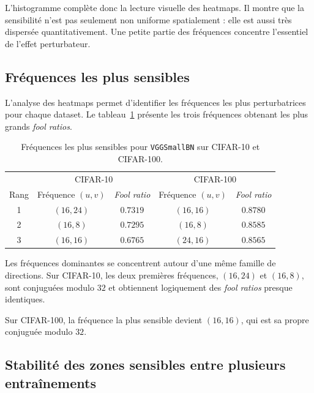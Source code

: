 L'histogramme complète donc la lecture visuelle des heatmaps. Il montre que la sensibilité n'est pas
seulement non uniforme spatialement : elle est aussi très dispersée quantitativement. Une petite partie
des fréquences concentre l'essentiel de l'effet perturbateur.

\subsection{Fréquences les plus sensibles}
\label{subsec:frequences_plus_sensibles}

L'analyse des heatmaps permet d'identifier les fréquences les plus perturbatrices pour chaque
dataset. Le tableau~\ref{tab:frequences_plus_sensibles} présente les trois fréquences obtenant les
plus grands \textit{fool ratios}.

\begin{table}[H]
    \centering
    \begin{tabular}{c|cc|cc}
        & \multicolumn{2}{c|}{CIFAR-10} & \multicolumn{2}{c}{CIFAR-100} \\
        Rang & Fréquence $(u,v)$ & \textit{Fool ratio} & Fréquence $(u,v)$ & \textit{Fool ratio} \\
        \hline
        1 & $(16,24)$ & $0.7319$ & $(16,16)$ & $0.8780$ \\
        2 & $(16,8)$  & $0.7295$ & $(16,8)$  & $0.8585$ \\
        3 & $(16,16)$ & $0.6765$ & $(24,16)$ & $0.8565$ \\
    \end{tabular}
    \caption{Fréquences les plus sensibles pour \texttt{VGGSmallBN} sur CIFAR-10 et CIFAR-100.}
    \label{tab:frequences_plus_sensibles}
\end{table}

Les fréquences dominantes se concentrent autour d'une même famille de directions. Sur CIFAR-10, les deux premières fréquences,
$(16,24)$ et $(16,8)$, sont conjuguées modulo $32$ et obtiennent logiquement des \textit{fool ratios} presque
identiques. 

Sur CIFAR-100, la fréquence la plus sensible devient $(16,16)$, qui est sa propre conjuguée modulo
$32$.

\subsection{Stabilité des zones sensibles entre plusieurs entraînements}
\label{subsec:stabilite_multi_seeds}

